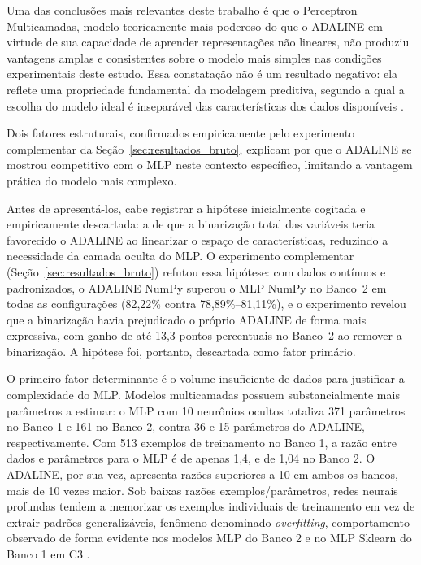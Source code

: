 Uma das conclusões mais relevantes deste trabalho é que o Perceptron Multicamadas, modelo teoricamente mais poderoso do que o ADALINE em virtude de sua capacidade de aprender representações não lineares, não produziu vantagens amplas e consistentes sobre o modelo mais simples nas condições experimentais deste estudo. Essa constatação não é um resultado negativo: ela reflete uma propriedade fundamental da modelagem preditiva, segundo a qual a escolha do modelo ideal é inseparável das características dos dados disponíveis \cite{silva2016}.

Dois fatores estruturais, confirmados empiricamente pelo experimento complementar da Seção~\ref{sec:resultados_bruto}, explicam por que o ADALINE se mostrou competitivo com o MLP neste contexto específico, limitando a vantagem prática do modelo mais complexo.

Antes de apresentá-los, cabe registrar a hipótese inicialmente cogitada e empiricamente descartada: a de que a binarização total das variáveis teria favorecido o ADALINE ao linearizar o espaço de características, reduzindo a necessidade da camada oculta do MLP. O experimento complementar (Seção~\ref{sec:resultados_bruto}) refutou essa hipótese: com dados contínuos e padronizados, o ADALINE NumPy superou o MLP NumPy no Banco~2 em todas as configurações (82,22\% contra 78,89\%--81,11\%), e o experimento revelou que a binarização havia prejudicado o próprio ADALINE de forma mais expressiva, com ganho de até 13,3 pontos percentuais no Banco~2 ao remover a binarização. A hipótese foi, portanto, descartada como fator primário.

O primeiro fator determinante é o volume insuficiente de dados para justificar a complexidade do MLP. Modelos multicamadas possuem substancialmente mais parâmetros a estimar: o MLP com 10 neurônios ocultos totaliza 371 parâmetros no Banco 1 e 161 no Banco 2, contra 36 e 15 parâmetros do ADALINE, respectivamente. Com 513 exemplos de treinamento no Banco 1, a razão entre dados e parâmetros para o MLP é de apenas 1,4, e de 1,04 no Banco 2. O ADALINE, por sua vez, apresenta razões superiores a 10 em ambos os bancos, mais de 10 vezes maior. Sob baixas razões exemplos/parâmetros, redes neurais profundas tendem a memorizar os exemplos individuais de treinamento em vez de extrair padrões generalizáveis, fenômeno denominado \textit{overfitting}, comportamento observado de forma evidente nos modelos MLP do Banco 2 e no MLP Sklearn do Banco 1 em C3 \cite{braga2007}.

